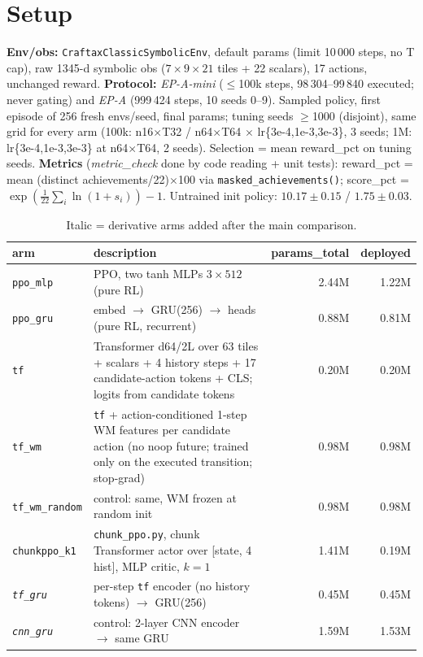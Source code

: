 \documentclass[10pt]{article}
\newcommand{\p}[1]{\texttt{\small #1}}
\begin{document}
\section*{Setup}
\textbf{Env/obs:} \p{CraftaxClassicSymbolicEnv}, default params (limit 10\,000 steps, no T cap), raw 1345-d symbolic obs ($7{\times}9{\times}21$ tiles + 22 scalars), 17 actions, unchanged reward.
\textbf{Protocol:} \emph{EP-A-mini} ($\le$100k steps, 98\,304--99\,840 executed; never gating) and \emph{EP-A} (999\,424 steps, 10 seeds 0--9). Sampled policy, first episode of 256 fresh envs/seed, final params; tuning seeds $\ge$1000 (disjoint), same grid for every arm (100k: n16$\times$T32 / n64$\times$T64 $\times$ lr\{3e-4,1e-3,3e-3\}, 3 seeds; 1M: lr\{3e-4,1e-3,3e-3\} at n64$\times$T64, 2 seeds). Selection = mean reward\_pct on tuning seeds.
\textbf{Metrics} (\emph{metric\_check} done by code reading + unit tests): reward\_pct = mean (distinct achievements/22)$\times$100 via \p{masked\_achievements()}; score\_pct = $\exp(\frac1{22}\sum_i\ln(1+s_i))-1$. Untrained init policy: $10.17\pm0.15$ / $1.75\pm0.03$.

\begin{table}[h]\centering\small
\begin{tabular}{@{}p{2.3cm}p{8.4cm}rr@{}}\toprule
arm & description & params\_total & deployed\\\midrule
\p{ppo\_mlp} & PPO, two tanh MLPs $3{\times}512$ (pure RL) & 2.44M & 1.22M\\
\p{ppo\_gru} & embed $\to$ GRU(256) $\to$ heads (pure RL, recurrent) & 0.88M & 0.81M\\
\p{tf} & Transformer d64/2L over 63 tiles + scalars + 4 history steps + 17 candidate-action tokens + CLS; logits from candidate tokens & 0.20M & 0.20M\\
\p{tf\_wm} & \p{tf} + action-conditioned 1-step WM features per candidate action (no noop future; trained only on the executed transition; stop-grad) & 0.98M & 0.98M\\
\p{tf\_wm\_random} & control: same, WM frozen at random init & 0.98M & 0.98M\\
\p{chunkppo\_k1} & \p{chunk\_ppo.py}, chunk Transformer actor over [state, 4 hist], MLP critic, $k{=}1$ & 1.41M & 0.19M\\
\emph{\p{tf\_gru}} & per-step \p{tf} encoder (no history tokens) $\to$ GRU(256) & 0.45M & 0.45M\\
\emph{\p{cnn\_gru}} & control: 2-layer CNN encoder $\to$ same GRU & 1.59M & 1.53M\\\bottomrule
\end{tabular}
\caption*{Italic = derivative arms added after the main comparison.}
\end{table}
\end{document}
